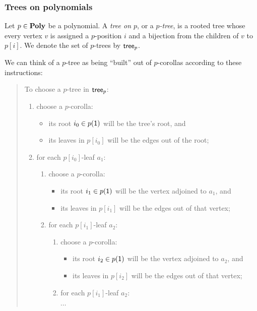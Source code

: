 \documentclass[Book-Poly]{subfiles}
\begin{document}
\subsubsection{Trees on polynomials}

\begin{definition} \label{def.poly_tree}
Let $p\in\mathbf{Poly}$ be a polynomial.
A \emph{tree on $p$}, or a \emph{$p$-tree}, is a rooted tree whose every vertex $v$ is assigned a $p$-position $i$ and a bijection from the children of $v$ to $p[i]$.
We denote the set of $p$-trees by $\mathsf{tree}_p$.
\end{definition}
We can think of a $p$-tree as being ``built'' out of $p$-corollas according to these instructions:
\begin{quote}
To choose a $p$-tree in $\mathsf{tree}_p$:
\begin{enumerate}
    \item choose a $p$-corolla:
    \begin{itemize}
        \item its root $i_0\in p(\textsf{1})$ will be the tree's root, and
        \item its leaves in $p[i_0]$ will be the edges out of the root;
    \end{itemize}
    \item for each $p[i_0]$-leaf $a_1$:
    \begin{enumerate}[label*=\arabic*.]
        \item choose a $p$-corolla:
        \begin{itemize}
            \item its root $i_1\in p(\textsf{1})$ will be the vertex adjoined to $a_1$, and
            \item its leaves in $p[i_1]$ will be the edges out of that vertex;
        \end{itemize}
        \item for each $p[i_1]$-leaf $a_2$:
        \begin{enumerate}[label*=\arabic*.]
            \item choose a $p$-corolla:
            \begin{itemize}
                \item its root $i_2\in p(\textsf{1})$ will be the vertex adjoined to $a_2$, and
                \item its leaves in $p[i_2]$ will be the edges out of that vertex;
            \end{itemize}
            \item for each $p[i_1]$-leaf $a_2$:

            $\cdots$
        \end{enumerate}
    \end{enumerate}
\end{enumerate}
\end{quote}
\end{document}
